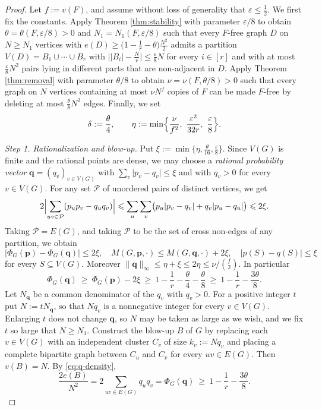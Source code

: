 \documentclass[11pt, a4paper]{article}
\theoremstyle{definition}
\theoremstyle{plain}
\renewcommand{\le}{\leqslant}
\renewcommand{\ge}{\geqslant}
\begin{document}
\begin{proof}
Let $f:=v(F)$, and assume without loss of generality
that $\varepsilon\le\frac12$. We first fix the
constants. 
Apply Theorem \ref{thm:stability} with parameter
$\varepsilon/8$ to obtain $\theta=\theta(F,\varepsilon/8)>0$
and $N_1=N_1(F,\varepsilon/8)$ such that every $F$-free
graph $D$ on $N\ge N_1$ vertices with
$e(D)\ge\bigl(1-\frac1r-\theta\bigr)\frac{N^2}{2}$
admits a partition $V(D)=B_1\cup\cdots\cup B_r$ with
$\bigl\lvert|B_i|-\frac Nr\bigr\rvert
\le\frac{\varepsilon}{8}N$ for every $i\in[r]$ and
with at most $\frac{\varepsilon}{8}N^2$ pairs lying
in different parts that are non-adjacent in $D$.
Apply Theorem \ref{thm:removal} with parameter
$\theta/8$ to obtain $\nu=\nu(F,\theta/8)>0$ such that
every graph on $N$ vertices containing at most
$\nu N^f$ copies of $F$ can be made $F$-free
by deleting at most $\frac{\theta}{8}N^2$ edges.
Finally, we set  
\[
  \delta:=\frac{\theta}{4},
  \qquad
  \eta:=\min\Bigl\{\frac{\nu}{f^2},\
  \frac{\varepsilon^2}{32r},\
  \frac{\varepsilon}{8}\Bigr\}.
\]



\noindent
\textit{Step 1. Rationalization and blow-up.}
Put $\xi:=\min\{\eta,\frac{\theta}{16},\frac{\varepsilon}{8}\}$. Since $V(G)$ is finite and the rational points are dense, 
we may choose a {\it rational probability vector} $\bm q=(q_v)_{v\in V(G)}$ with
$\sum_{v}\lvert p_v-q_v\rvert\le\xi$ and with $q_v>0$ for every $v\in V(G)$. 
For any set $\mathcal P$ of unordered pairs of distinct vertices, we get 
\[
  2\Bigl\lvert\sum_{uv\in\mathcal P}
  (p_up_v-q_uq_v)\Bigr\rvert
  \le\sum_{u}\sum_{v}
  \bigl(p_u\lvert p_v-q_v \rvert
  +q_v\lvert p_u-q_u \rvert\bigr)\le2\xi .
\]
Taking $\mathcal P=E(G)$, 
and taking $\mathcal P$ to be the set
of cross non-edges of any partition, we obtain 
\begin{equation}\label{eq:rat}
  \lvert\Phi_G(\bm p)-\Phi_G(\bm q)\rvert\le2\xi,
  \quad
  M(G,\bm p, \cdot)\le M(G,\bm q, \cdot)+2\xi,
  \quad
  \lvert p(S)-q(S)\rvert\le\xi
\end{equation}
for every $S\subseteq V(G)$. Moreover
$\lVert\bm q\rVert_\infty\le\eta+\xi\le2\eta
\le\nu/\binom f2$. In particular
\begin{equation}\label{eq:q-density}
  \Phi_G(\bm q)\ \ge\ \Phi_G(\bm p)-2\xi
  \ \ge\ 1-\frac1r-\frac{\theta}{4}
   -\frac{\theta}{8}
  \ \ge\ 1-\frac1r-\frac{3\theta}{8}.
\end{equation}
Let $N_{\bm q}$ be a common denominator of the $q_v$ with $q_v >0$. For a positive integer $t$ put
$N:=tN_{\bm q}$, so that $Nq_v$ is a nonnegative integer
for every $v\in V(G)$. Enlarging $t$ does not change
$\bm q$, so $N$ may be taken as large as we wish, and
we fix $t$ so large that $N\ge N_1$. Construct the
blow-up $B$ of $G$ by replacing each $v\in V(G)$ with an
independent cluster $C_v$ of size $k_v:=Nq_v$ and placing a complete bipartite graph between $C_u$ and
$C_v$ for every $uv\in E(G)$. 
Then $v(B)=N$.  By  \eqref{eq:q-density},
\begin{equation}\label{eq:blowup-density}
  \frac{2e(B)}{N^2}
  =2\sum_{uv\in E(G)}q_uq_v
  =\Phi_{G}(\bm q)
  \ \ge\ 1-\frac1r-\frac{3\theta}{8}.
\end{equation}


\end{proof}
\end{document}
